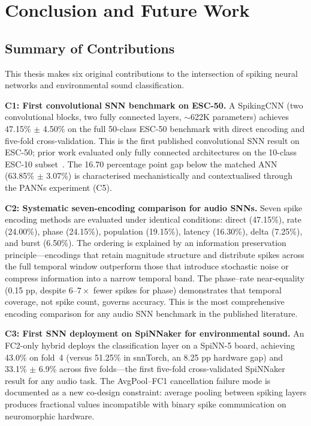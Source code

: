 
\chapter{Conclusion and Future Work}
\label{ch:conclusion}

\section{Summary of Contributions}
\label{sec:contributions-summary}

This thesis makes six original contributions to the intersection of spiking neural networks and environmental sound classification.

\textbf{C1: First convolutional SNN benchmark on ESC-50.}
A SpikingCNN (two convolutional blocks, two fully connected layers, $\sim$622K parameters) achieves 47.15\% $\pm$ 4.50\% on the full 50-class ESC-50 benchmark with direct encoding and five-fold cross-validation. This is the first published convolutional SNN result on ESC-50; prior work evaluated only fully connected architectures on the 10-class ESC-10 subset~\citep{larroza2025}. The 16.70 percentage point gap below the matched ANN (63.85\% $\pm$ 3.07\%) is characterised mechanistically and contextualised through the PANNs experiment (C5).

\textbf{C2: Systematic seven-encoding comparison for audio SNNs.}
Seven spike encoding methods are evaluated under identical conditions: direct (47.15\%), rate (24.00\%), phase (24.15\%), population (19.15\%), latency (16.30\%), delta (7.25\%), and burst (6.50\%). The ordering is explained by an information preservation principle---encodings that retain magnitude structure and distribute spikes across the full temporal window outperform those that introduce stochastic noise or compress information into a narrow temporal band. The phase--rate near-equality (0.15 pp, despite $6$--$7\times$ fewer spikes for phase) demonstrates that temporal coverage, not spike count, governs accuracy. This is the most comprehensive encoding comparison for any audio SNN benchmark in the published literature.

\textbf{C3: First SNN deployment on SpiNNaker for environmental sound.}
An FC2-only hybrid deploys the classification layer on a SpiNN-5 board, achieving 43.0\% on fold~4 (versus 51.25\% in snnTorch, an 8.25 pp hardware gap) and 33.1\% $\pm$ 6.9\% across five folds---the first five-fold cross-validated SpiNNaker result for any audio task. The AvgPool--FC1 cancellation failure mode is documented as a new co-design constraint: average pooling between spiking layers produces fractional values incompatible with binary spike communication on neuromorphic hardware.

